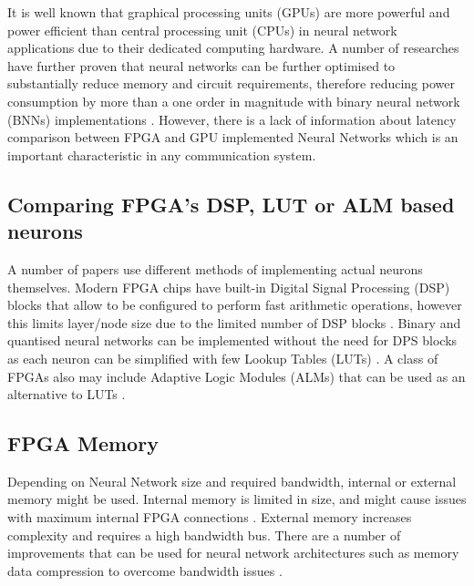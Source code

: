 It is well known that graphical processing units (GPUs) are more powerful and power efficient than central processing unit (CPUs) in neural network applications due to their dedicated computing hardware. A number of researches have further proven that neural networks can be further optimised to substantially reduce memory and circuit requirements, therefore reducing power consumption by more than a one order in magnitude with binary neural network (BNNs) implementations \autocite{7929192,8702332,8954866}. However, there is a lack of information about latency comparison between FPGA and GPU implemented Neural Networks which is an important characteristic in any communication system.

\subsection{Comparing FPGA's DSP, LUT or ALM based neurons}
\label{sec:dsp_lut_alm}

A number of papers use different methods of implementing actual neurons themselves. Modern FPGA chips have built-in Digital Signal Processing (DSP) blocks that allow to be configured to perform fast arithmetic operations, however this limits layer/node size due to the limited number of DSP blocks \autocite{8693488,8892181,8330546}. Binary and quantised neural networks can be implemented without the need for DPS blocks as each neuron can be simplified with few Lookup Tables (LUTs) \autocite{8966187,8280163,8369336,8108073}. A class of FPGAs also may include Adaptive Logic Modules (ALMs) that can be used as an alternative to LUTs \autocite{8702332}.

\subsection{FPGA Memory}
\label{sec:fpga_memory}

Depending on Neural Network size and required bandwidth, internal or external memory might be used. Internal memory is limited in size, and might cause issues with maximum internal FPGA connections \autocite{7929192}.
External memory increases complexity and requires a high bandwidth bus. There are a number of improvements that can be used for neural network architectures such as memory data compression to overcome bandwidth issues \autocite{9012821}. 

